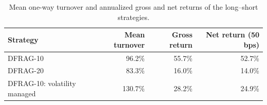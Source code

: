 \begin{table}[!htbp]
\centering
\footnotesize
\caption{Mean one-way turnover and annualized gross and net returns of the long--short strategies.}
\label{tab:long-short-implementation}
\begin{tabular}{lrrr}
\toprule
Strategy & Mean turnover & Gross return & Net return (50 bps) \\
\midrule
DFRAG-10 & 96.2\% & 55.7\% & 52.7\% \\
DFRAG-20 & 83.3\% & 16.0\% & 14.0\% \\
DFRAG-10: volatility managed & 130.7\% & 28.2\% & 24.9\% \\
\bottomrule
\end{tabular}
\end{table}
